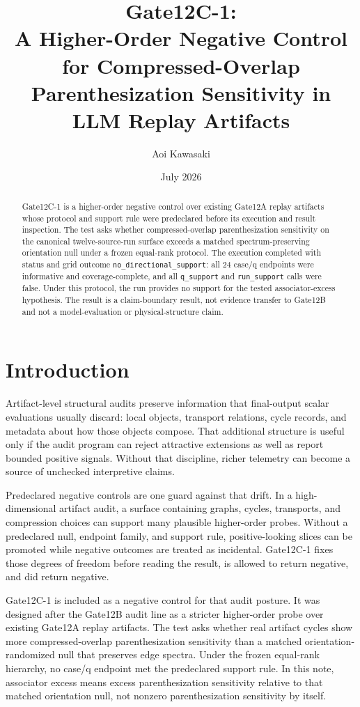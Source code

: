 \documentclass[11pt]{article}
\title{Gate12C-1:\\
A Higher-Order Negative Control for Compressed-Overlap\\
Parenthesization Sensitivity in LLM Replay Artifacts}
\author{Aoi Kawasaki}
\date{July 2026}
\newcommand{\code}[1]{\texttt{\detokenize{#1}}}
\newcommand{\breakcode}[1]{\begingroup\urlstyle{tt}\nolinkurl{#1}\endgroup}
\begin{document}
\maketitle

\begin{abstract}
Gate12C-1 is a higher-order negative control over existing Gate12A replay
artifacts whose protocol and support rule were predeclared before its execution
and result inspection. The test asks whether compressed-overlap
parenthesization sensitivity on the canonical twelve-source-run surface exceeds
a matched spectrum-preserving orientation null under a frozen equal-rank
protocol. The execution completed with status \code{complete} and grid outcome
\breakcode{no_directional_support}: all 24 case/q endpoints were informative
and coverage-complete, and all \breakcode{q_support} and
\breakcode{run_support} calls were
false. Under this protocol, the run provides no support for the tested
associator-excess hypothesis. The result is a claim-boundary result, not
evidence transfer to Gate12B and not a model-evaluation or physical-structure
claim.
\end{abstract}

\section{Introduction}
\label{sec:introduction}

Artifact-level structural audits preserve information that final-output scalar
evaluations usually discard: local objects, transport relations, cycle records,
and metadata about how those objects compose. That additional structure is
useful only if the audit program can reject attractive extensions as well as
report bounded positive signals. Without that discipline, richer telemetry can
become a source of unchecked interpretive claims.

Predeclared negative controls are one guard against that drift. In a
high-dimensional artifact audit, a surface containing graphs, cycles,
transports, and compression choices can support many plausible higher-order
probes. Without a predeclared null, endpoint family, and support rule,
positive-looking slices can be promoted while negative outcomes are treated as
incidental. Gate12C-1 fixes those degrees of freedom before reading the result,
is allowed to return negative, and did return negative.

Gate12C-1 is included as a negative control for that audit posture. It was
designed after the Gate12B audit line as a stricter higher-order probe over
existing Gate12A replay artifacts. The test asks whether real artifact cycles
show more compressed-overlap parenthesization sensitivity than a matched
orientation-randomized null that preserves edge spectra. Under the frozen
equal-rank hierarchy, no case/q endpoint met the predeclared support rule. In
this note, associator excess means
excess parenthesization sensitivity relative to that matched orientation null,
not nonzero parenthesization sensitivity by itself.
\end{document}
